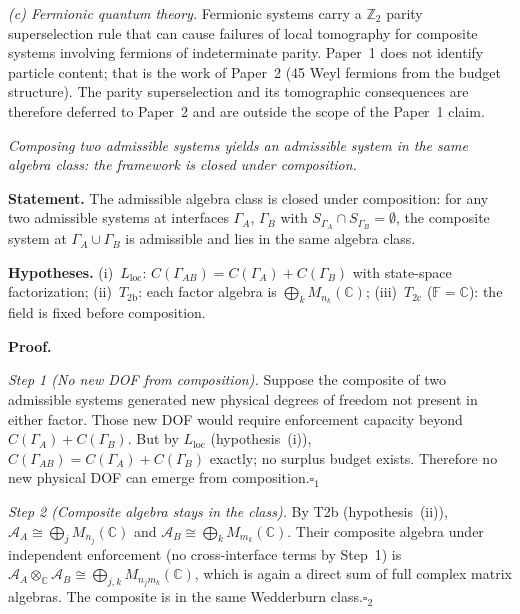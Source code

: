 \documentclass[11pt]{article}
\theoremstyle{remark}
\begin{document}
\textit{(c) Fermionic quantum theory.}  Fermionic systems carry a $\mathbb{Z}_2$ parity superselection rule that can cause failures of local tomography for composite systems involving fermions of indeterminate parity.  Paper~1 does not identify particle content; that is the work of Paper~2 (45 Weyl fermions from the budget structure).  The parity superselection and its tomographic consequences are therefore deferred to Paper~2 and are outside the scope of the Paper~1 claim.

\begin{tcolorbox}[apfbox, title={$P_{\mathrm{cls}}$: Compositional Closure}]
\textit{Composing two admissible systems yields an admissible system in the same algebra class: the framework is closed under composition.}

\smallskip\noindent\textbf{Statement.}  The admissible algebra class is closed under composition: for any two admissible systems at interfaces $\Gamma_A$, $\Gamma_B$ with $S_{\Gamma_A} \cap S_{\Gamma_B} = \emptyset$, the composite system at $\Gamma_A \cup \Gamma_B$ is admissible and lies in the same algebra class.

\smallskip\noindent\textbf{Hypotheses.}  (i)~$L_{\mathrm{loc}}$: $C(\Gamma_{AB}) = C(\Gamma_A) + C(\Gamma_B)$ with state-space factorization; (ii)~$T_{2\mathrm{b}}$: each factor algebra is $\bigoplus_k M_{n_k}(\mathbb{C})$; (iii)~$T_{2\mathrm{c}}$ ($\mathbb{F} = \mathbb{C}$): the field is fixed before composition.

\smallskip\noindent\textbf{Proof.}

\textit{Step 1 (No new DOF from composition).}  Suppose the composite of two admissible systems generated new physical degrees of freedom not present in either factor.  Those new DOF would require enforcement capacity beyond $C(\Gamma_A) + C(\Gamma_B)$.  But by $L_{\mathrm{loc}}$ (hypothesis~(i)), $C(\Gamma_{AB}) = C(\Gamma_A) + C(\Gamma_B)$ exactly; no surplus budget exists.  Therefore no new physical DOF can emerge from composition.\hfill$\square_1$

\textit{Step 2 (Composite algebra stays in the class).}  By T2b (hypothesis~(ii)), $\mathcal{A}_A \cong \bigoplus_j M_{n_j}(\mathbb{C})$ and $\mathcal{A}_B \cong \bigoplus_k M_{m_k}(\mathbb{C})$.  Their composite algebra under independent enforcement (no cross-interface terms by Step~1) is $\mathcal{A}_A \otimes_\mathbb{C} \mathcal{A}_B \cong \bigoplus_{j,k} M_{n_j m_k}(\mathbb{C})$, which is again a direct sum of full complex matrix algebras.  The composite is in the same Wedderburn class.\hfill$\square_2$


\end{tcolorbox}
\end{document}
